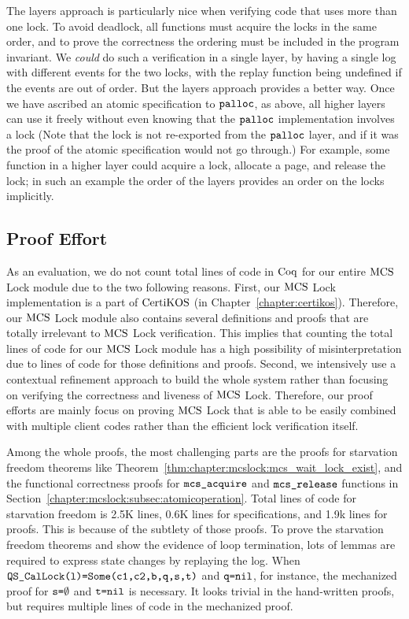 The layers approach is particularly nice when verifying code that uses more than one
lock. To avoid deadlock, all functions must acquire the locks in the
same order, and to prove the correctness the ordering must be
included in the program invariant. We \emph{could} do such a
verification in a single layer, by having a single log with different
events for the two locks, with the replay function being undefined if
the events are out of order. But the layers approach provides a
better way. Once we have ascribed an atomic specification to
${\mathrm{\texttt{palloc}}}$, as above, all higher layers can use it
freely without even knowing that the ${\mathrm{\texttt{palloc}}}$ implementation
involves a lock (Note that the lock is not re-exported from the
${\mathrm{\texttt{palloc}}}$ layer, and if it was the proof of the atomic
specification would not go through.)  For example, some function in a
higher layer could acquire a lock, allocate a page, and release the
lock; in such an example the order of the layers provides an order
on the locks implicitly.

\subsection{Proof Effort}


As an evaluation, we do not count  total lines of code in $\mathrm{Coq}$ for our entire 
$\mathrm{MCS}$ Lock module due to the two following reasons. First, our $\mathrm{MCS}$ Lock implementation 
is a part of $\mathrm{CertiKOS}$ (in Chapter~\ref{chapter:certikos}). Therefore, our $\mathrm{MCS}$ Lock module also contains several definitions 
and proofs that are totally irrelevant to $\mathrm{MCS}$ Lock verification. 
This implies that counting the total lines of code for our $\mathrm{MCS}$ Lock module has a 
high possibility of misinterpretation due to  lines of code for those definitions and proofs.
Second, we intensively use a contextual refinement approach to 
build the whole system rather than focusing on verifying the correctness and 
liveness of $\mathrm{MCS}$ Lock. Therefore, our proof efforts are mainly focus on proving 
$\mathrm{MCS}$ Lock that is able to be easily combined with multiple client codes 
rather than the efficient lock verification itself.  

Among the whole proofs, the most challenging parts are the proofs for starvation 
freedom theorems like Theorem~\ref{thm:chapter:mcslock:mcs_wait_lock_exist}, 
and the functional correctness proofs for ${\mathrm{\texttt{mcs\_acquire}}}$ 
and ${\mathrm{\texttt{mcs\_release}}}$ functions
in Section~\ref{chapter:mcslock:subsec:atomicoperation}.
Total lines of code for starvation freedom is 2.5K lines, 0.6K lines for specifications, 
and 1.9k lines for proofs. This is because of the subtlety of those proofs. 
To prove the starvation freedom theorems and show the evidence of loop termination,
lots of lemmas are required to express
state changes by replaying the log. 
When ${\mathrm{\texttt{QS\_CalLock}}}{\mathrm{\texttt{(l)=}}}{\mathrm{\texttt{Some}}}{\mathrm{\texttt{(c1,c2,b,q,s,t)}}}$
and ${\mathrm{\texttt{q=}}}{\mathrm{\texttt{nil}}}$, 
for instance, the mechanized proof for ${\mathrm{\texttt{s=}}}\emptyset$ 
and ${\mathrm{\texttt{t=}}}{\mathrm{\texttt{nil}}}$ is necessary. It looks trivial in the hand-written proofs, 
but requires multiple lines of code in the mechanized proof. 



